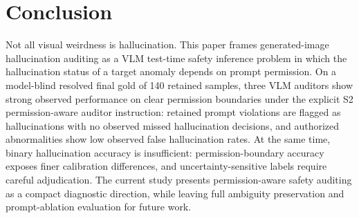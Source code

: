 \documentclass[runningheads]{llncs}
\begin{document}
\section{Conclusion}

Not all visual weirdness is hallucination. This paper frames generated-image hallucination auditing as a VLM test-time safety inference problem in which the hallucination status of a target anomaly depends on prompt permission. On a model-blind resolved final gold of 140 retained samples, three VLM auditors show strong observed performance on clear permission boundaries under the explicit S2 permission-aware auditor instruction: retained prompt violations are flagged as hallucinations with no observed missed hallucination decisions, and authorized abnormalities show low observed false hallucination rates. At the same time, binary hallucination accuracy is insufficient: permission-boundary accuracy exposes finer calibration differences, and uncertainty-sensitive labels require careful adjudication. The current study presents permission-aware safety auditing as a compact diagnostic direction, while leaving full ambiguity preservation and prompt-ablation evaluation for future work.



\end{document}
